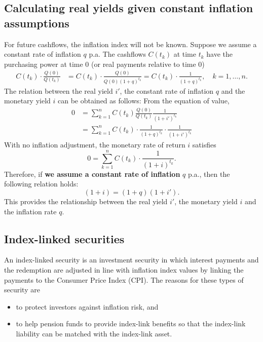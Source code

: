 \documentclass[landscape, 20pt]{extreport}
\theoremstyle{definition}
\theoremstyle{definition}
\theoremstyle{definition}
\theoremstyle{definition}
\theoremstyle{remark}
\begin{document}
\hypertarget{calculating-real-yields-given-constant-inflation-assumptions}{%
\subsection{Calculating real yields given constant inflation assumptions}\label{calculating-real-yields-given-constant-inflation-assumptions}}

For future cashflows, the inflation index will not be known. Suppose we
assume a constant rate of inflation \(q\) p.a. The cashflows \(C(t_k)\) at
time \(t_k\) have the purchasing power at time 0 (or real payments
relative to time 0) \[\begin{aligned}
    C(t_k) \cdot \frac{Q(0)}{Q(t_k)} &=     C(t_k) \cdot \frac{Q(0)}{Q(0)(1+q)^{t_k}}  =  C(t_k) \cdot \frac{1}{(1+q)^{t_k}} , \quad k = 1, \ldots, n.\end{aligned}\]
The relation between the real yield \(i'\), the constant rate of inflation
\(q\) and the monetary yield \(i\) can be obtained as follows: From the
equation of value, \[\begin{aligned}
    0   &= \sum_{k=1}^n C(t_k) \frac{Q(0)}{Q(t_k)} \frac{1}{(1 + i')^{t_k}} \\
        &=  \sum_{k=1}^n C(t_k)  \cdot \frac{1}{(1+q)^{t_k}}\cdot \frac{1}{(1 + i')^{t_k}}\end{aligned}\]
With no inflation adjustment, the monetary rate of return \(i\) satisfies
\[0 =  \sum_{k=1}^n C(t_k)  \cdot \frac{1}{(1+i)^{t_k}}.\] Therefore, if
\textbf{we assume a constant rate of inflation} \(q\) p.a., then the following
relation holds: \[(1 +i) = ( 1 + q)(1+i').\] This provides the
relationship between the real yield \(i'\), the monetary yield \(i\) and the
inflation rate \(q\).

\hypertarget{index-linked-securities}{%
\subsection{Index-linked securities}\label{index-linked-securities}}

An index-linked security is an investment security in which interest
payments and the redemption are adjusted in line with inflation index
values by linking the payments to the Consumer Price Index (CPI). The
reasons for these types of security are

\begin{itemize}
\item
  to protect investors against inflation risk, and
\item
  to help pension funds to provide index-link benefits so that the
  index-link liability can be matched with the index-link asset.
\end{itemize}
\end{document}
